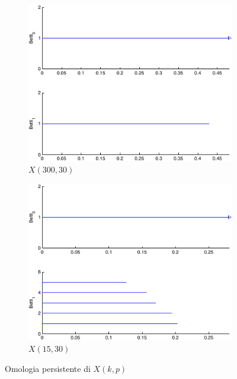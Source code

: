 \begin{figure}[ht]
  \begin{center}
    \begin{subfigure}[b]{.45\textwidth}
      \includegraphics[width=\textwidth]{gfx/image_patches_k300.pdf}
      \caption{$X(300,30)$}\label{fig:k300persistence}
    \end{subfigure}
    \begin{subfigure}[b]{.45\textwidth}
      \includegraphics[width=\textwidth]{gfx/image_patches_k15.pdf}
      \caption{$X(15,30)$}\label{fig:k15persistence}
    \end{subfigure}
    \caption{Omologia persistente di $X(k,p)$}
  \end{center}
\end{figure}

